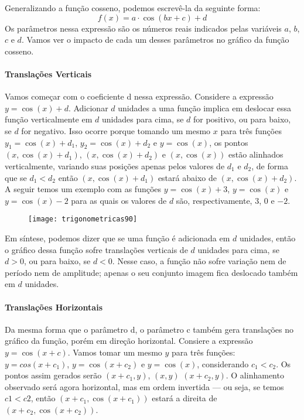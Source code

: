 \label{trig-exp6}

Generalizando a função cosseno, podemos escrevê-la da seguinte forma:
\begin{equation*}
f(x)= a\cdot\cos(bx+c)+d
\end{equation*}
Os parâmetros nessa expressão são os números reais indicados pelas variáveis $a$, $b$, $c$ e $d$. Vamos ver o impacto de cada um desses parâmetros no gráfico da função cosseno.

\paragraph{Translações Verticais}
Vamos começar com o coeficiente d nessa expressão. Considere a expressão $y=\cos(x)+d$. Adicionar $d$ unidades a uma função implica em deslocar essa função verticalmente em $d$ unidades para cima, se $d$ for positivo, ou para baixo, se $d$ for negativo. Isso ocorre porque tomando um mesmo $x$ para três funções $y_1 = \cos(x)+d_1$, $y_2=\cos(x)+d_2$ e $y=\cos(x)$, os pontos $(x,\cos(x)+d_1)$, $(x,\cos(x)+d_2)$ e $(x,\cos(x))$ estão alinhados verticalmente, variando suas posições apenas pelos valores de $d_1$ e $d_2$, de forma que se $d_1<d_2$ então $(x,\cos(x)+d_1)$ estará abaixo de $(x,\cos(x)+d_2)$. A seguir temos um exemplo com as funções $y=\cos(x)+3$, $y=\cos(x)$ e $y=\cos(x)-2$ para as quais os valores de $d$ são, respectivamente, $3$, $0$ e $-2$.


\begin{figure}[H]
\centering

\texttt{[image: trigonometricas90]}
\end{figure}

Em síntese, podemos dizer que se uma função é adicionada em $d$ unidades, então o gráfico dessa função sofre translações verticais de $d$ unidades para cima, se $d>0$, ou para baixo, se $d<0$. Nesse caso, a função não sofre variação nem de período nem de amplitude; apenas o seu conjunto imagem fica deslocado também em $d$ unidades.


\paragraph{Translações Horizontais}

Da mesma forma que o parâmetro d, o parâmetro c também gera translações no gráfico da função, porém em direção horizontal. Consiere a expressão $y=\cos(x+c)$. Vamos tomar um mesmo $y$ para três funções: $y=cos(x+c_1)$, $y=\cos(x+c_2)$ e $y=\cos(x)$, considerando $c_1<c_2$. Os pontos assim gerados serão $(x+c_1, y)$, $(x,y)$ $(x+c_2, y)$. O alinhamento observado será agora horizontal, mas em ordem invertida --- ou seja, se temos $c1 < c2$, então $(x+c_1, \cos(x+c_1))$ estará a direita de $(x+c_2, \cos(x+c_2))$.

